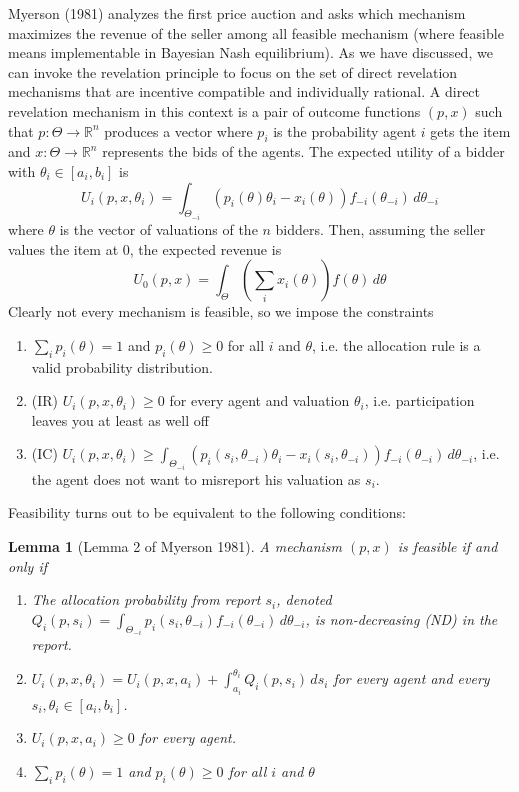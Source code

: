 \documentclass[letter, 10pt]{article}
\newtheorem{lemma}[theorem]{Lemma}
\theoremstyle{definition}
\newcommand{\R}{\mathbb{R}}
\begin{document}
\begin{spacing}{1.1}
Myerson (1981) analyzes the first price auction and asks
which mechanism maximizes the revenue of the seller among
all feasible mechanism (where feasible means
implementable in Bayesian Nash equilibrium). As we have
discussed, we can invoke the revelation principle  to
focus on the set of direct revelation mechanisms that are
incentive compatible and individually rational. A direct
revelation mechanism in this context is a pair of outcome
functions $(p,x)$ such that $p:\Theta\to \R^n$ produces a
vector where $p_i$ is the probability agent $i$ gets the
item and $x:\Theta\to\R^n$ represents the bids of the
agents. The expected utility of a bidder with
$\theta_i\in[a_i,b_i]$ is
\begin{equation}
  \label{eq:2}
  U_i(p,x,\theta_i) = \int_{\Theta_{-i}}
  (p_i(\theta)\theta_i - x_i(\theta))f_{-i}(\theta_{-i})\,d\theta_{-i}
\end{equation}
where $\theta$ is the vector of valuations of the $n$
bidders. Then, assuming the seller values the item at $0$, the expected revenue is
\begin{equation}
  \label{eq:3}
  U_0(p,x) = \int_\Theta \left(\sum_i x_i(\theta)\right)
  f(\theta)\, d\theta
\end{equation}
Clearly not every mechanism is feasible, so we impose the constraints
\begin{enumerate}
\item $\sum_i p_i(\theta) = 1$ and $p_i(\theta) \ge 0$
  for all $i$ and $\theta$, i.e. the allocation rule is a
  valid probability distribution.
\item (IR) $U_i(p,x,\theta_i) \ge 0$ for every agent and
  valuation $\theta_i$, i.e. participation leaves you at
  least as well off
\item (IC) $U_i(p,x,\theta_i) \ge \int_{\Theta_{-i}}
  (p_i(s_i,\theta_{-i}) \theta_i - x_i(s_i,\theta_{-i}))
  f_{-i}(\theta_{-i})\,d\theta_{-i}$, i.e. the agent does
  not want to misreport his valuation as $s_i$.
\end{enumerate}

Feasibility turns out to be equivalent to the following
conditions:
\begin{lemma}[Lemma 2 of Myerson 1981]
  A mechanism $(p,x)$ is feasible if and only if
  \begin{enumerate}
  \item The allocation probability from report $s_i$,
    denoted $Q_i(p,s_i) = \int_{\Theta_{-i}}
    p_i(s_i,\theta_{-i})
    f_{-i}(\theta_{-i})\,d\theta_{-i}$, is non-decreasing (ND)
      in the report.
    \item $U_i(p,x,\theta_i) = U_i(p,x,a_i) +
      \int_{a_i}^{\theta_i} Q_i(p,s_i) \, ds_i$ for every
      agent and every $s_i,\theta_i \in [a_i,b_i]$.
    \item $U_i(p,x,a_i) \ge 0$ for every agent.
    \item  $\sum_i p_i(\theta) = 1$ and $p_i(\theta) \ge 0$
  for all $i$ and $\theta$
  \end{enumerate}


\end{lemma}
\end{spacing}
\end{document}
